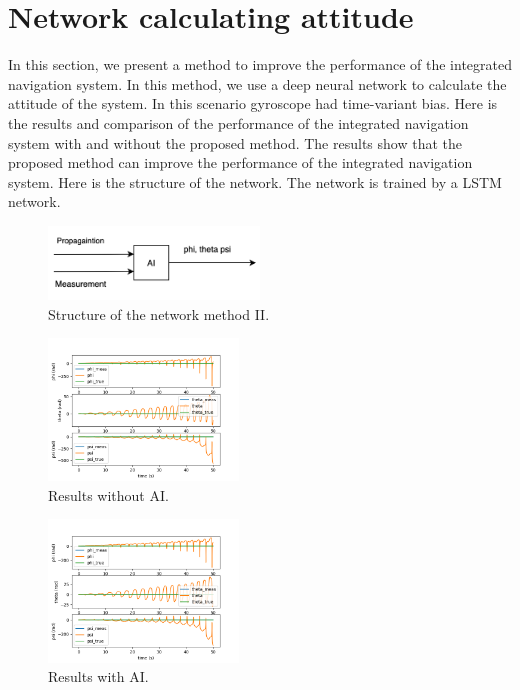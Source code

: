 \documentclass[conference]{IEEEtran}
\begin{document}
    \section{Network calculating attitude}
    In this section, we present a method to improve the performance of the integrated navigation system. In this method, we use a deep neural network to calculate the attitude of the system. In this scenario gyroscope had time-variant bias. Here is the results and comparison of the performance of the integrated navigation system with and without the proposed method. The results show that the proposed method can improve the performance of the integrated navigation system. Here is the structure of the network. The network is trained by a LSTM network.
    \begin{figure}[H]
        \centerline{\includegraphics[width=0.5\textwidth]{../Figures/part_2_network.png}}
        \caption{Structure of the network method II.}
    \end{figure}
    \begin{figure}[H]
        \centerline{\includegraphics[width=0.45\textwidth]{../Figures/part_2.png}}
        \caption{Results without AI.}
    \end{figure}

    \begin{figure}[H]
        \centerline{\includegraphics[width=0.45\textwidth]{../Figures/part_2_AI.png}}
        \caption{Results with AI.}
    \end{figure}
\end{document}
